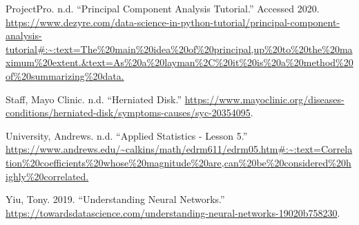 \documentclass[
]{article}
\begin{document}
\leavevmode\hypertarget{ref-PCA}{}%
ProjectPro. n.d. ``Principal Component Analysis Tutorial.'' Accessed
2020.
\url{https://www.dezyre.com/data-science-in-python-tutorial/principal-component-analysis-tutorial\#:~:text=The\%20main\%20idea\%20of\%20principal,up\%20to\%20the\%20maximum\%20extent.\&text=As\%20a\%20layman\%2C\%20it\%20is\%20a\%20method\%20of\%20summarizing\%20data.}

\leavevmode\hypertarget{ref-Hernia}{}%
Staff, Mayo Clinic. n.d. ``Herniated Disk.''
\url{https://www.mayoclinic.org/diseases-conditions/herniated-disk/symptoms-causes/syc-20354095}.

\leavevmode\hypertarget{ref-Cor}{}%
University, Andrews. n.d. ``Applied Statistics - Lesson 5.''
\url{https://www.andrews.edu/~calkins/math/edrm611/edrm05.htm\#:~:text=Correlation\%20coefficients\%20whose\%20magnitude\%20are,can\%20be\%20considered\%20highly\%20correlated.}

\leavevmode\hypertarget{ref-NNs}{}%
Yiu, Tony. 2019. ``Understanding Neural Networks.''
\url{https://towardsdatascience.com/understanding-neural-networks-19020b758230}.
\end{document}
